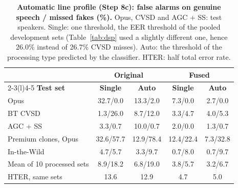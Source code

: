 \documentclass[10pt,a4paper,twocolumn]{article}
\begin{document}
\begin{table}[t]
\centering\footnotesize
\caption{\textbf{Automatic line profile (Step 8c): false alarms on genuine speech / missed fakes (\%).} Opus, CVSD and AGC + SS: test speakers. Single: one threshold, the EER threshold of the pooled development sets (Table~\ref{tab:dsp} used a slightly different one, hence 26.0\% instead of 26.7\% CVSD misses). Auto: the threshold of the processing type predicted by the classifier. HTER: half total error rate.}
\label{tab:autocal}
\setlength{\tabcolsep}{3pt}
\begin{tabular}{@{}p{}cccc@{}}
\toprule
 & \multicolumn{2}{c}{\textbf{Original}} & \multicolumn{2}{c}{\textbf{Fused}}\\
\cmidrule(lr){2-3}\cmidrule(l){4-5}
\textbf{Test set} & \textbf{Single} & \textbf{Auto} & \textbf{Single} & \textbf{Auto}\\
\midrule
Opus & 32.7/0.0 & 13.3/2.0 & 7.3/0.0 & 2.7/0.0\\
BT CVSD & 1.3/26.0 & 8.7/12.0 & 3.3/4.7 & 4.0/5.3\\
AGC + SS & 3.3/0.7 & 10.0/0.7 & 2.0/0.0 & 1.3/0.7\\
Premium clones, Opus & 32.6/57.7 & 12.9/78.4 & 12.4/22.4 & 7.3/32.8\\
In-the-Wild & 4.7/5.7 & 3.3/9.7 & 0.7/8.0 & 0.7/9.7\\
\midrule
Mean of 10 processed sets & 8.9/18.2 & 6.8/19.0 & 3.8/5.7 & 3.2/6.7\\
HTER, same sets & 13.6 & 12.9 & 4.7 & 5.0\\
\bottomrule
\end{tabular}
\end{table}
\end{document}
